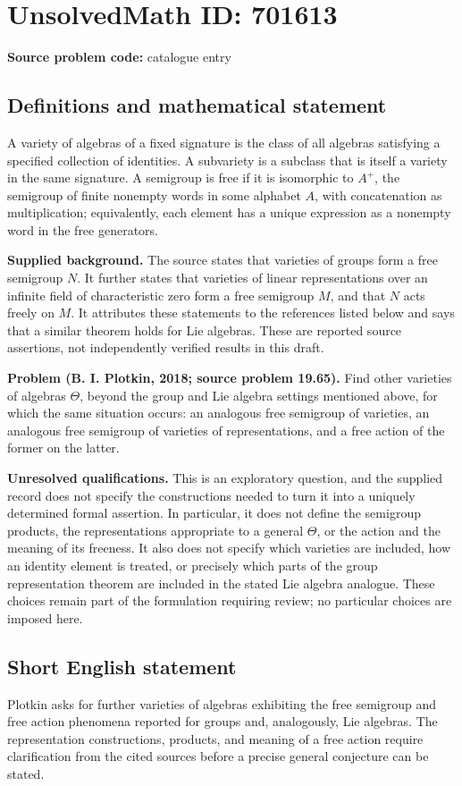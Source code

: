 \documentclass[11pt]{article}
\begin{document}
\section*{UnsolvedMath ID: 701613}
\textbf{Source problem code:} catalogue entry
\subsection{Definitions and mathematical statement}
A variety of algebras of a fixed signature is the class of all algebras satisfying a specified collection of identities. A subvariety is a subclass that is itself a variety in the same signature. A semigroup is free if it is isomorphic to \(A^{+}\), the semigroup of finite nonempty words in some alphabet \(A\), with concatenation as multiplication; equivalently, each element has a unique expression as a nonempty word in the free generators.

\textbf{Supplied background.} The source states that varieties of groups form a free semigroup \(N\). It further states that varieties of linear representations over an infinite field of characteristic zero form a free semigroup \(M\), and that \(N\) acts freely on \(M\). It attributes these statements to the references listed below and says that a similar theorem holds for Lie algebras. These are reported source assertions, not independently verified results in this draft.

\textbf{Problem (B. I. Plotkin, 2018; source problem 19.65).} Find other varieties of algebras \(\Theta\), beyond the group and Lie algebra settings mentioned above, for which the same situation occurs: an analogous free semigroup of varieties, an analogous free semigroup of varieties of representations, and a free action of the former on the latter.

\textbf{Unresolved qualifications.} This is an exploratory question, and the supplied record does not specify the constructions needed to turn it into a uniquely determined formal assertion. In particular, it does not define the semigroup products, the representations appropriate to a general \(\Theta\), or the action and the meaning of its freeness. It also does not specify which varieties are included, how an identity element is treated, or precisely which parts of the group representation theorem are included in the stated Lie algebra analogue. These choices remain part of the formulation requiring review; no particular choices are imposed here.
\subsection{Short English statement}
Plotkin asks for further varieties of algebras exhibiting the free semigroup and free action phenomena reported for groups and, analogously, Lie algebras. The representation constructions, products, and meaning of a free action require clarification from the cited sources before a precise general conjecture can be stated.
\end{document}
